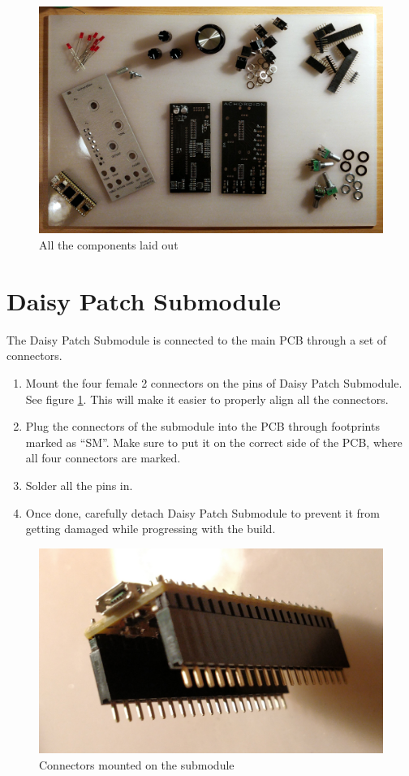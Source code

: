 \documentclass[10pt,a4paper,twocolumn]{article}
\begin{document}
\begin{figure}[p]
  \centering
  \includegraphics[width=\linewidth]{p01.jpg}
  \caption{All the components laid out}
\end{figure}

\section{Daisy Patch Submodule}

The Daisy Patch Submodule is connected to the main PCB through a set of connectors.

\begin{enumerate}
  \item Mount the four female 2 connectors on the pins of Daisy Patch Submodule. See figure \ref{daisy}. This will make it easier to properly align all the connectors.
  \item Plug the connectors of the submodule into the PCB through footprints marked as ``SM''. Make sure to put it on the correct side of the PCB, where all four connectors are marked.
  \item Solder all the pins in.
  \item Once done, carefully detach Daisy Patch Submodule to prevent it from getting damaged while progressing with the build.
\end{enumerate}

\begin{figure}[p]
  \centering
  \includegraphics[width=\linewidth]{p04.jpg}
  \caption{Connectors mounted on the submodule}
  \label{daisy}
\end{figure}
\end{document}
